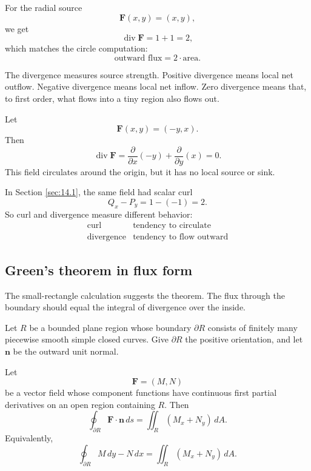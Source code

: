 For the radial source
\[
    \mathbf F(x,y)=(x,y),
\]
we get
\[
    \operatorname{div}\mathbf F=1+1=2,
\]
which matches the circle computation:
\[
    \text{outward flux}=2\cdot\text{area}.
\]

The divergence measures source strength.  Positive divergence means local net outflow.
Negative divergence means local net inflow.  Zero divergence means that, to first
order, what flows into a tiny region also flows out.

\begin{example}
Let
\[
    \mathbf F(x,y)=(-y,x).
\]
Then
\[
    \operatorname{div}\mathbf F
    =
    \frac{\partial}{\partial x}(-y)
    +
    \frac{\partial}{\partial y}(x)
    =
    0.
\]
This field circulates around the origin, but it has no local source or sink.

In Section \ref{sec:14.1}, the same field had scalar curl
\[
    Q_x-P_y=1-(-1)=2.
\]
So curl and divergence measure different behavior:
\[
\begin{array}{c|c}
\text{curl} & \text{tendency to circulate}\\[1mm]
\text{divergence} & \text{tendency to flow outward}
\end{array}
\]
\end{example}

\subsection{Green's theorem in flux form}

The small-rectangle calculation suggests the theorem.  The flux through the boundary
should equal the integral of divergence over the inside.

\begin{theorem}
Let \(R\) be a bounded plane region whose boundary \(\partial R\) consists of finitely
many piecewise smooth simple closed curves.  Give \(\partial R\) the positive
orientation, and let \(\mathbf n\) be the outward unit normal.

Let
\[
    \mathbf F=(M,N)
\]
be a vector field whose component functions have continuous first partial derivatives
on an open region containing \(R\).  Then
\[
\boxed{
    \oint_{\partial R}\mathbf F\cdot\mathbf n\,ds
    =
    \iint_R (M_x+N_y)\,dA.
}
\]
Equivalently,
\[
\boxed{
    \oint_{\partial R} M\,dy-N\,dx
    =
    \iint_R (M_x+N_y)\,dA.
}
\]
\end{theorem}

